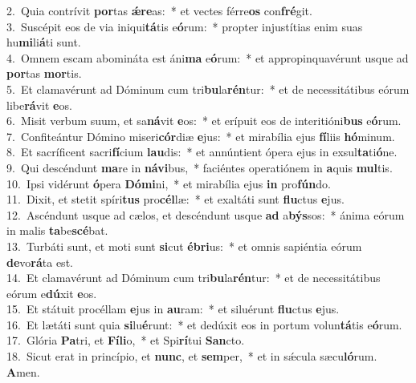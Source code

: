 {2.~}Quia contrívit \textbf{por}tas \textbf{ǽ}\textbf{re}as:~* et vectes férre\textbf{os} con\textbf{fré}git.\\
{3.~}Suscépit eos de via iniqui\textbf{tá}tis e\textbf{ó}rum:~* propter injustítias enim suas hu\textbf{mi}li\textbf{á}ti sunt.\\
{4.~}Omnem escam abomináta est áni\textbf{ma} e\textbf{ó}rum:~* et appropinquavérunt usque ad \textbf{por}tas \textbf{mor}tis.\\
{5.~}Et clamavérunt ad Dóminum cum tri\textbf{bu}la\textbf{rén}tur:~* et de necessitátibus eórum libe\textbf{rá}vit \textbf{e}os.\\
{6.~}Misit verbum suum, et sa\textbf{ná}vit \textbf{e}os:~* et erípuit eos de interitióni\textbf{bus} e\textbf{ó}rum.\\
{7.~}Confiteántur Dómino miseri\textbf{cór}diæ \textbf{e}jus:~* et mirabília ejus \textbf{fí}liis \textbf{hó}minum.\\
{8.~}Et sacríficent sacri\textbf{fí}cium \textbf{lau}dis:~* et annúntient ópera ejus in exsul\textbf{ta}ti\textbf{ó}ne.\\
{9.~}Qui descéndunt \textbf{ma}re in \textbf{ná}\textbf{vi}bus,~* faciéntes operatiónem in \textbf{a}quis \textbf{mul}tis.\\
{10.~}Ipsi vidérunt \textbf{ó}pera \textbf{Dó}\textbf{mi}ni,~* et mirabília ejus \textbf{in} pro\textbf{fún}do.\\
{11.~}Dixit, et stetit spíri\textbf{tus} pro\textbf{cél}læ:~* et exaltáti sunt \textbf{flu}ctus \textbf{e}jus.\\
{12.~}Ascéndunt usque ad cælos, et descéndunt usque \textbf{ad} a\textbf{býs}sos:~* ánima eórum in malis \textbf{ta}be\textbf{scé}bat.\\
{13.~}Turbáti sunt, et moti sunt \textbf{si}cut \textbf{é}\textbf{bri}us:~* et omnis sapiéntia eórum \textbf{de}vo\textbf{rá}ta est.\\
{14.~}Et clamavérunt ad Dóminum cum tri\textbf{bu}la\textbf{rén}tur:~* et de necessitátibus eórum e\textbf{dú}xit \textbf{e}os.\\
{15.~}Et státuit procéllam \textbf{e}jus in \textbf{au}ram:~* et siluérunt \textbf{flu}ctus \textbf{e}jus.\\
{16.~}Et lætáti sunt quia \textbf{si}lu\textbf{é}runt:~* et dedúxit eos in portum volun\textbf{tá}tis e\textbf{ó}rum.\\
{17.~}Glória \textbf{Pa}tri, et \textbf{Fí}\textbf{li}o,~* et Spi\textbf{rí}tui \textbf{San}cto.\\
{18.~}Sicut erat in princípio, et \textbf{nunc}, et \textbf{sem}per,~* et in sǽcula sæcu\textbf{ló}rum. \textbf{A}men.\\
